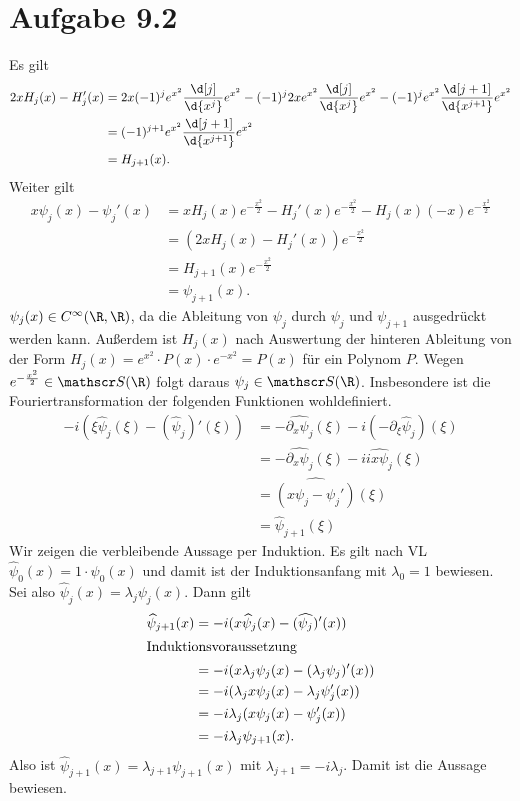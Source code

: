 \documentclass{article}
\begin{document}
    \section*{Aufgabe 9.2}
    Es gilt
    \begin{align*}
        2 xH_j(x) - H_j'(x) &= 2x (-1)^j e^{x^2} \frac{\d[j]}{\d{x^j}}e^{x^2} - (-1)^j 2xe^{x^2} \frac{\d[j]}{\d{x^j}}e^{x^2} - (-1)^j e^{x^2} \frac{\d[j+1]}{\d{x^{j+1}}}e^{x^2}\\
        &= (-1)^{j+1} e^{x^2} \frac{\d[j+1]}{\d{x^{j+1}}}e^{x^2}\\
        &= H_{j+1}(x).
    \end{align*}
    Weiter gilt
    \begin{align*}
        x\psi_j(x) - \psi_j'(x) &= x H_j(x) e^{-\frac{x^2}{2}} - H_j'(x)e^{-\frac{x^2}{2}} - H_j(x) (-x)e^{-\frac{x^2}{2}}\\
        &= (2x H_j(x) - H_j'(x))e^{-\frac{x^2}{2}}\\
        &= H_{j+1}(x)e^{-\frac{x^2}{2}}\\
        &= \psi_{j+1}(x).
    \end{align*}
    $\psi_j(x) \in C^\infty(\R, \R)$, da die Ableitung von $\psi_j$ durch $\psi_j$ und $\psi_{j+1}$ ausgedrückt werden kann.
    Außerdem ist $H_j(x)$ nach Auswertung der hinteren Ableitung von der Form $H_j(x) = e^{x^2} \cdot P(x) \cdot e^{-x^2} = P(x)$ für ein Polynom $P$. Wegen $e^{-\frac{x^2}{2}} \in \mathscr S(\R)$ folgt daraus $\psi_j \in \mathscr S(\R)$.
    Insbesondere ist die Fouriertransformation der folgenden Funktionen wohldefiniert.
    \begin{align*}
        -i(\xi \widehat \psi_j(\xi) - (\widehat \psi_j)'(\xi)) &= - \widehat{\partial_x \psi_j}(\xi) -i (- \partial_\xi \widehat \psi_j)(\xi)\\
        &=- \widehat{\partial_x \psi_j}(\xi) -i \widehat{ix\psi_j}(\xi)\\
        &= \widehat{(x \psi_j - \psi_j')}(\xi)\\
        &= \widehat{\psi}_{j+1}(\xi)
    \end{align*}
    Wir zeigen die verbleibende Aussage per Induktion. 
    Es gilt nach VL $\widehat{\psi}_0(x) = 1\cdot \psi_0(x)$ und damit ist der Induktionsanfang mit $\lambda_0 = 1$ bewiesen.
    Sei also $\widehat{\psi}_j(x) = \lambda_j \psi_j(x)$. Dann gilt
    \begin{align*}
        \widehat{\psi}_{j+1}(x) &= -i(x \widehat{\psi}_j(x) - (\widehat{\psi_j})'(x))\\
        \intertext{Induktionsvoraussetzung}
        &= -i(x \lambda_j \psi_j(x) - (\lambda_j \psi_j)'(x))\\
        &= -i(\lambda_j x\psi_j(x) - \lambda_j \psi_j'(x))\\
        &= -i\lambda_j (x\psi_j(x) - \psi_j'(x))\\
        &= - i\lambda_j \psi_{j+1}(x).
    \end{align*}
    Also ist $\widehat{\psi}_{j+1}(x) = \lambda_{j+1} \psi_{j+1}(x)$ mit $\lambda_{j+1} = -i\lambda_j$. Damit ist die Aussage bewiesen.
\end{document}
